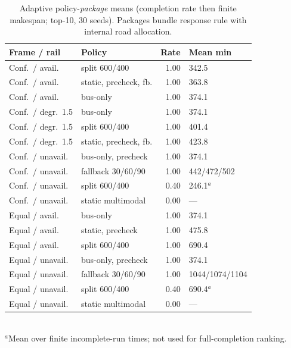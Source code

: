 \documentclass{ieeeaccess}
\begin{document}
\begin{table}[!t]
\caption{Adaptive policy-\emph{package} means (completion rate then finite makespan; top-10, 30 seeds). Packages bundle response rule with internal road allocation.}
\label{tab:adaptive}
\centering
\footnotesize
\begin{tabular}{@{}llrl@{}}
\hline
Frame / rail & Policy & Rate & Mean min \\
\hline
Conf.\ / avail. & split 600/400 & 1.00 & 342.5 \\
Conf.\ / avail. & static, precheck, fb. & 1.00 & 363.8 \\
Conf.\ / avail. & bus-only & 1.00 & 374.1 \\
Conf.\ / degr.\ 1.5 & bus-only & 1.00 & 374.1 \\
Conf.\ / degr.\ 1.5 & split 600/400 & 1.00 & 401.4 \\
Conf.\ / degr.\ 1.5 & static, precheck, fb. & 1.00 & 423.8 \\
Conf.\ / unavail. & bus-only, precheck & 1.00 & 374.1 \\
Conf.\ / unavail. & fallback 30/60/90 & 1.00 & 442/472/502 \\
Conf.\ / unavail. & split 600/400 & 0.40 & 246.1$^{a}$ \\
Conf.\ / unavail. & static multimodal & 0.00 & --- \\
Equal / avail. & bus-only & 1.00 & 374.1 \\
Equal / avail. & static, precheck & 1.00 & 475.8 \\
Equal / avail. & split 600/400 & 1.00 & 690.4 \\
Equal / unavail. & bus-only, precheck & 1.00 & 374.1 \\
Equal / unavail. & fallback 30/60/90 & 1.00 & 1044/1074/1104 \\
Equal / unavail. & split 600/400 & 0.40 & 690.4$^{a}$ \\
Equal / unavail. & static multimodal & 0.00 & --- \\
\hline
\end{tabular}
\\
$^{a}$Mean over finite incomplete-run times; not used for full-completion ranking.
\end{table}
\end{document}
